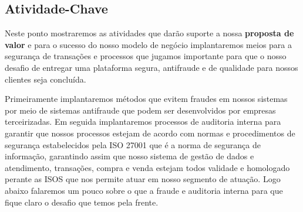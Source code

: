 \documentclass[a4paper]{article}
\begin{document}
\subsection{Atividade-Chave}
\par Neste ponto mostraremos as atividades que darão suporte a nossa \textbf{proposta de valor} e para o sucesso do nosso modelo de negócio implantaremos meios para a segurança de transações e processos que jugamos importante para que o nosso desafio de entregar uma plataforma segura, antifraude e de qualidade para nossos clientes seja concluída.
\par Primeiramente implantaremos métodos que evitem fraudes em nossos sistemas por meio de sistemas antifraude que podem ser desenvolvidos por empresas terceirizadas. Em seguida implantaremos processos de auditoria interna para garantir que nossos processos estejam de acordo com normas e procedimentos de segurança estabelecidos pela ISO 27001 que é a norma de segurança de informação, garantindo assim que nosso sistema de gestão de dados e atendimento, transações, compra e venda estejam todos validade e homologado perante as ISOS que nos permite atuar em nosso segmento de atuação. Logo abaixo falaremos um pouco sobre o que a fraude e auditoria interna para que fique claro o desafio que temos pela frente.
\end{document}
